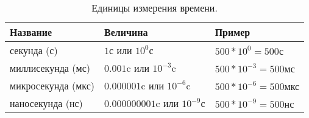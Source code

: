 \documentclass[../sparc.tex]{subfiles}
\begin{document}
\begin{table}[H]
  \begin{tabular}{p{3cm}|p{4cm}|p{3cm}}
    Название & Величина & Пример \\
    \hline \hline
    секунда (с) & $ 1 \mbox{с} $ или $ 10^0 \mbox{с} $ & $ 500 * 10^{0} = 500 \mbox{с} $ \\
    \hline
    миллисекунда (мс) & $ 0.001 \mbox{c} $ или $ 10^{-3} \mbox{c} $ & $ 500 * 10^{-3} = 500 \mbox{мс} $ \\
    \hline
    микросекунда (мкс) & $ 0.000001 \mbox{c} $ или $ 10^{-6} \mbox{c} $ & $ 500 * 10^{-6} = 500 \mbox{мкс} $ \\
    \hline
    наносекунда (нс) & $ 0.000000001 \mbox{c} $ или $ 10^{-9} \mbox{с} $ & $ 500 * 10^{-9} = 500 \mbox{нс} $
  \end{tabular}
  \caption{Единицы измерения времени.}
  \label{table:timescale-units}
\end{table}
\end{document}
